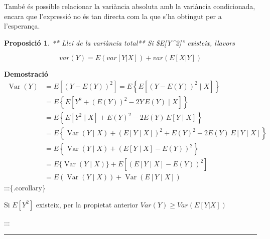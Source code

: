 \documentclass[
  catalan,
]{article}
\newtheorem{proposition}{Proposició}[section]
\theoremstyle{definition}
\theoremstyle{definition}
\theoremstyle{definition}
\theoremstyle{definition}
\theoremstyle{remark}
\begin{document}
També és possible relacionar la variància absoluta amb la variància condicionada, encara que l'expressió no és tan directa com la que s'ha obtingut per a l'esperança.

\begin{proposition}
** Llei de la variància total**
Si \$E{[}Y\^{}2{]}'' existeix, llavors

\[
var(Y)=E(var[Y|X])+ var(E[X|Y])  \label{eq:varcond}
\]
\end{proposition}

\textbf{Demostració}
\[
\begin{aligned}
\operatorname{Var}(Y)
&= E\left[(Y - E(Y))^2\right]= E\left\{E\left[(Y - E(Y))^2 \mid X\right]\right\} \\
&= E\left\{E\left[Y^2 + (E(Y))^2 - 2Y\,E(Y)\mid X\right]\right\} \\
&= E\left\{E[Y^2\mid X] + E(Y)^2 - 2E(Y)\,E[Y\mid X]\right\} \\
&= E\left\{\operatorname{Var}(Y\mid X)
+ (E[Y\mid X])^2
+ E(Y)^2
- 2E(Y)\,E[Y\mid X]\right\} \\
&= E\left\{\operatorname{Var}(Y\mid X)
+ \left(E[Y\mid X]-E(Y)\right)^2\right\} \\
&= E\{\operatorname{Var}(Y\mid X)\}
+ E\left[\left(E[Y\mid X]-E(Y)\right)^2\right] \\
&= E\left(\operatorname{Var}(Y\mid X)\right)
+ \operatorname{Var}\left(E[Y\mid X]\right)
\end{aligned}
\]
:::\{.corollary\}

Si \(E[Y^2]\) existeix, per la propietat anterior \(Var(Y) \geq Var(E[Y|X])\)

:::

\begin{center}\rule{0.5\linewidth}{0.5pt}\end{center}
\end{document}

